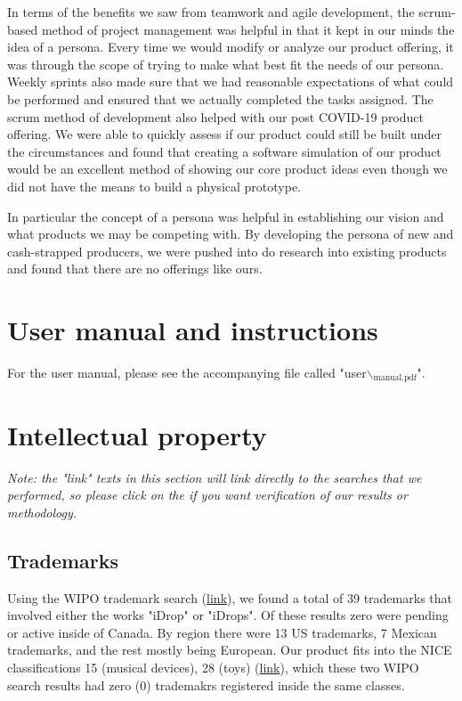 \documentclass[11pt]{article}
\begin{document}
In terms of the benefits we saw from teamwork and agile development,
the scrum-based method of project management was helpful in that it
kept in our minds the idea of a persona. Every time we would modify or
analyze our product offering, it was through the scope of trying to
make what best fit the needs of our persona. Weekly sprints also made
sure that we had reasonable expectations of what could be performed
and ensured that we actually completed the tasks assigned. The scrum
method of development also helped with our post COVID-19 product
offering. We were able to quickly assess if our product could still be
built under the circumstances and found that creating a software
simulation of our product would be an excellent method of showing our
core product ideas even though we did not have the means to build a
physical prototype.

In particular the concept of a persona was helpful in establishing our
vision and what products we may be competing with. By developing the
persona of new and cash-strapped producers, we were pushed into do
research into existing products and found that there are no offerings
like ours.

\section{User manual and instructions}
\label{sec:org50b9233}
For the user manual, please see the accompanying file called
"user$\backslash$\(_{\text{manual.pdf}}\)".
\section{Intellectual property}
\label{sec:org32775c9}
\emph{Note: the "link" texts in this section will link directly to the searches that we performed, so please click on the if you want verification of our results or methodology.}

\subsection{Trademarks}
\label{sec:org8f81b9d}
Using the WIPO trademark search (\href{https://www3.wipo.int/branddb/en/}{link}), we found a total of 39 trademarks
that involved either the works "iDrop" or "iDrops".  Of these results
zero were pending or active inside of Canada. By region there were 13
US trademarks, 7 Mexican trademarks, and the rest mostly being
European. Our product fits into the NICE classifications 15 (musical devices),
28 (toys) (\href{https://www.wipo.int/classifications/nice/nclpub/en/fr/}{link}), which these two WIPO search results had zero (0)
trademakrs registered inside the same classes.
\end{document}
